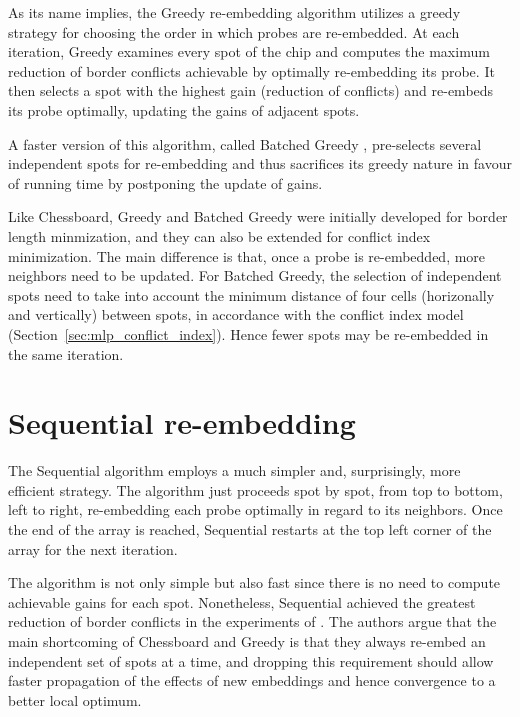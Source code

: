 As its name implies, the Greedy re-embedding algorithm \citep{Kahng2002}
utilizes a greedy strategy for choosing the order in which probes are
re-embedded. At each iteration, Greedy examines every spot of the chip and
computes the maximum reduction of border conflicts achievable by optimally
re-embedding its probe. It then selects a spot with the highest gain (reduction
of conflicts) and re-embeds its probe optimally, updating the gains of adjacent
spots.

A faster version of this algorithm, called Batched Greedy \citep{Kahng2002},
pre-selects several independent spots for re-embedding and thus sacrifices its
greedy nature in favour of running time by postponing the update of gains.

Like Chessboard, Greedy and Batched Greedy were initially developed for border
length minmization, and they can also be extended for conflict index
minimization. The main difference is that, once a probe is re-embedded, more
neighbors need to be updated. For Batched Greedy, the selection of independent
spots need to take into account the minimum distance of four cells (horizonally
and vertically) between spots, in accordance with the conflict index model
(Section~\ref{sec:mlp_conflict_index}). Hence fewer spots may be re-embedded
in the same iteration.

\section{Sequential re-embedding}
\label{sec:reembed_sequential}

The Sequential algorithm \citep{Kahng2003a} employs a much simpler and,
surprisingly, more efficient strategy. The algorithm just proceeds spot by spot,
from top to bottom, left to right, re-embedding each probe optimally in regard
to its neighbors. Once the end of the array is reached, Sequential restarts at
the top left corner of the array for the next iteration.

The algorithm is not only simple but also fast since there is no need to compute
achievable gains for each spot. Nonetheless, Sequential achieved the greatest
reduction of border conflicts in the experiments of \citet{Kahng2003a}. The
authors argue that the main shortcoming of Chessboard and Greedy is that they
always re-embed an independent set of spots at a time, and dropping this
requirement should allow faster propagation of the effects of new embeddings and
hence convergence to a better local optimum.

